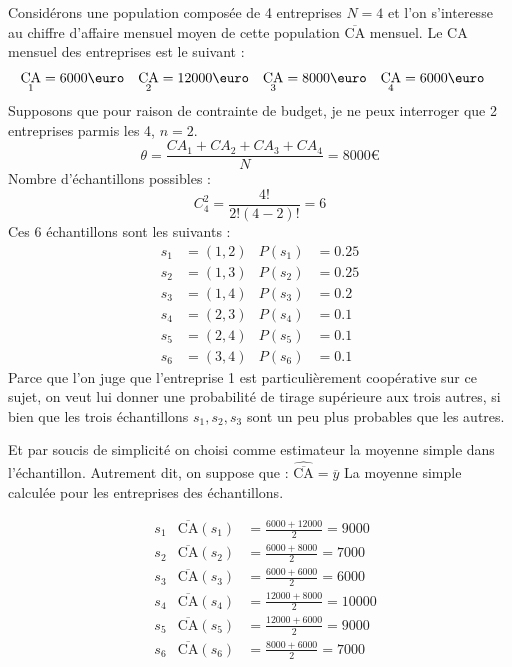 \documentclass[a4paper]{article}
\DeclareMathOperator{\CA}{CA}
\begin{document}
\begin{Exemple}
Considérons une population composée de 4 entreprises $N = 4$ et l'on s'interesse au chiffre d'affaire mensuel moyen de cette population
$\overline{\text{CA}}$ mensuel. Le CA mensuel des entreprises est le suivant :
\begin{align*}
    \CA_1 &= 6000 \text{\euro} &\CA_2 &= 12000 \text{\euro} &\CA_3 &= 8000 \text{\euro} &\CA_4 &= 6000 \text{\euro}
\end{align*}
Supposons que pour raison de contrainte de budget, je ne peux interroger que 2 entreprises parmis les 4, $n=2$.
\begin{equation*}
    \theta = \frac{CA_1 + CA_2 + CA_3+CA_4}{N} = 8000 €  %
\end{equation*}
Nombre d'échantillons possibles :
\begin{equation*}
    C^2_4 = \frac{4!}{2!(4-2)!} = 6
\end{equation*}
Ces 6 échantillons sont les suivants : 
\begin{align*}
    s_1 &= (1,2) & P(s_1) &= 0.25 \\
    s_2 &= (1,3) & P(s_2) &= 0.25 \\
    s_3 &= (1,4) & P(s_3) &= 0.2 \\
    s_4 &= (2,3) & P(s_4) &= 0.1 \\
    s_5 &= (2,4) & P(s_5) &= 0.1 \\
    s_6 &= (3,4) & P(s_6) &= 0.1
\end{align*}
Parce que l'on juge que l'entreprise 1 est particulièrement coopérative sur ce sujet, on veut lui donner une probabilité de tirage supérieure aux
trois autres, si bien que les trois échantillons $s_1, s_2, s_3$ sont un peu plus probables que les autres. 

Et par soucis de simplicité on choisi comme estimateur la moyenne simple dans l'échantillon. Autrement dit, on suppose que :
$\hat{\overline{\text{CA}}} = \overline{y}$ La moyenne simple calculée pour les entreprises des échantillons.

\begin{align*}
    &s_1 &\overline{\text{CA}}(s_1) &= \frac{6000 + 12000}{2} = 9000 \\
    &s_2 &\overline{\text{CA}}(s_2) &= \frac{6000 + 8000}{2} = 7000 \\
    &s_3 &\overline{\text{CA}}(s_3) &= \frac{6000 + 6000}{2} = 6000 \\
    &s_4 &\overline{\text{CA}}(s_4) &= \frac{12000 + 8000}{2} = 10000 \\
    &s_5 &\overline{\text{CA}}(s_5) &= \frac{12000 + 6000}{2} = 9000 \\
    &s_6 &\overline{\text{CA}}(s_6) &= \frac{8000 + 6000}{2} = 7000
\end{align*}


\end{Exemple}
\end{document}
